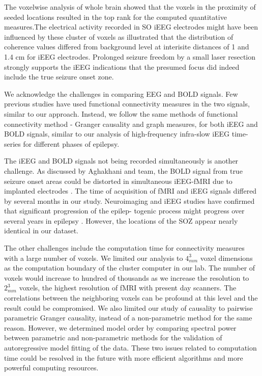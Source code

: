 The voxelwise analysis of whole brain showed that the voxels in the proximity of seeded locations resulted in the top rank for the computed quantitative measures.The electrical activity recorded in SO iEEG electrodes might have been influenced by these cluster of voxels as \citep{menon1996spatio} illustrated that the distribution of coherence values differed from background level at interisite distances of 1 and 1.4 cm for iEEG electrodes. Prolonged seizure freedom by a small laser resection strongly supports the iEEG indications that the presumed focus did indeed include the true seizure onset zone. 


We acknowledge the challenges in comparing EEG and BOLD signals. Few previous studies have used functional connectivity measures in the two signals,  similar to our approach. Instead, we follow the same methods of functional connectivity method - Granger causality and graph measures, for both iEEG and BOLD signals, similar to our analysis of high-frequency infra-slow iEEG time-series for different phases of epilepsy. 

The iEEG and BOLD signals not being recorded simultaneously is another challenge. As discussed by Aghakhani and team, the BOLD signal from true seizure onset areas could be distorted in simultaneous iEEG-fMRI due to implanted electrodes \citep{aghakhani2015co}. The time of acquisition of fMRI and iEEG signals differed by several months in our study. Neuroimaging and iEEG studies have confirmed that significant progression of the epilep- togenic process might progress over several years in epilepsy \citep{walker2002disease}. However, the locations of the SOZ appear nearly identical in our dataset.

The other challenges include the computation time for connectivity measures with a large number of voxels. We limited our analysis to $4_{mm}^3$ voxel dimensions as the computation boundary of the cluster computer in our lab. The number of voxels would increase to hundred of thousands as we increase the resolution to $2_{mm}^3$ voxels, the highest resolution of fMRI with present day scanners. The correlations between the neighboring voxels can be profound at this level and the result could be compromised. We also limited our study of causality to pairwise parametric Granger causality, instead of a non-parametric method for the same reason. However, we determined model order by comparing spectral power between parametric and non-parametric methods for the validation of autoregressive model fitting of the data. These two issues related to computation time could be resolved in the future with more efficient algorithms and more powerful computing resources. 

